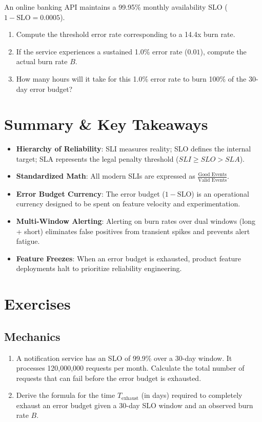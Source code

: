 \begin{tryityourselfbox}
An online banking API maintains a 99.95\% monthly availability SLO ($1 - \text{SLO} = 0.0005$). 
\begin{enumerate}
  \item Compute the threshold error rate corresponding to a 14.4x burn rate.
  \item If the service experiences a sustained 1.0\% error rate ($0.01$), compute the actual burn rate $B$.
  \item How many hours will it take for this 1.0\% error rate to burn 100\% of the 30-day error budget?
\end{enumerate}
\end{tryityourselfbox}

\section{Summary \protect\& Key Takeaways}

\begin{itemize}[leftmargin=18pt]
  \item \textbf{Hierarchy of Reliability}: SLI measures reality; SLO defines the internal target; SLA represents the legal penalty threshold ($SLI \ge SLO > SLA$).
  \item \textbf{Standardized Math}: All modern SLIs are expressed as $\frac{\text{Good Events}}{\text{Valid Events}}$.
  \item \textbf{Error Budget Currency}: The error budget ($1 - \text{SLO}$) is an operational currency designed to be spent on feature velocity and experimentation.
  \item \textbf{Multi-Window Alerting}: Alerting on burn rates over dual windows (long + short) eliminates false positives from transient spikes and prevents alert fatigue.
  \item \textbf{Feature Freezes}: When an error budget is exhausted, product feature deployments halt to prioritize reliability engineering.
\end{itemize}

\section{Exercises}

\subsection*{Mechanics}
\begin{enumerate}[leftmargin=18pt]
  \item A notification service has an SLO of 99.9\% over a 30-day window. It processes 120,000,000 requests per month. Calculate the total number of requests that can fail before the error budget is exhausted.
  \item Derive the formula for the time $T_{\text{exhaust}}$ (in days) required to completely exhaust an error budget given a 30-day SLO window and an observed burn rate $B$.
\end{enumerate}


